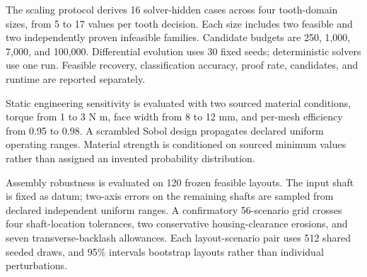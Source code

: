 \documentclass[preprint,12pt]{elsarticle}
\begin{document}
The scaling protocol derives 16 solver-hidden cases across four tooth-domain sizes, from 5 to 17 values per tooth decision. Each size includes two feasible and two independently proven infeasible families. Candidate budgets are 250, 1,000, 7,000, and 100,000. Differential evolution uses 30 fixed seeds; deterministic solvers use one run. Feasible recovery, classification accuracy, proof rate, candidates, and runtime are reported separately.

Static engineering sensitivity is evaluated with two sourced material conditions, torque from 1 to 3 N m, face width from 8 to 12 mm, and per-mesh efficiency from 0.95 to 0.98. A scrambled Sobol design propagates declared uniform operating ranges. Material strength is conditioned on sourced minimum values rather than assigned an invented probability distribution.

Assembly robustness is evaluated on 120 frozen feasible layouts. The input shaft is fixed as datum; two-axis errors on the remaining shafts are sampled from declared independent uniform ranges. A confirmatory 56-scenario grid crosses four shaft-location tolerances, two conservative housing-clearance erosions, and seven transverse-backlash allowances. Each layout-scenario pair uses 512 shared seeded draws, and 95\% intervals bootstrap layouts rather than individual perturbations.
\end{document}
